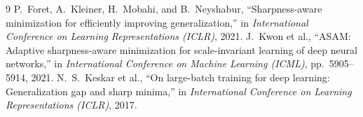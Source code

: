 \documentclass[11pt,a4paper]{article}
\theoremstyle{definition}
\begin{document}
\begin{thebibliography}{9}
 P.~Foret, A.~Kleiner, H.~Mobahi, and B.~Neyshabur, ``Sharpness-aware minimization for efficiently improving generalization,'' in \emph{International Conference on Learning Representations (ICLR)}, 2021.
 J.~Kwon et al., ``ASAM: Adaptive sharpness-aware minimization for scale-invariant learning of deep neural networks,'' in \emph{International Conference on Machine Learning (ICML)}, pp.~5905--5914, 2021.
 N.~S.~Keskar et al., ``On large-batch training for deep learning: Generalization gap and sharp minima,'' in \emph{International Conference on Learning Representations (ICLR)}, 2017.
\end{thebibliography}
\end{document}

